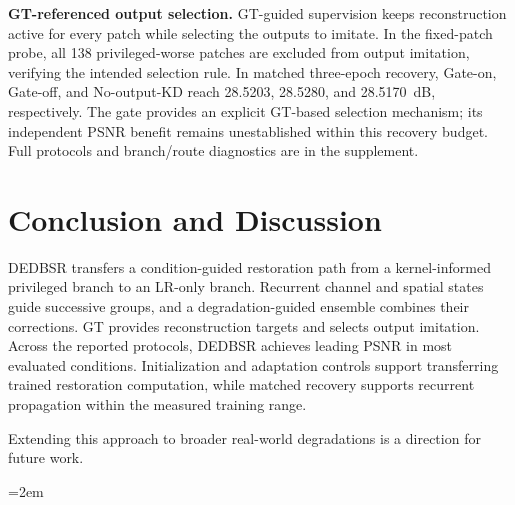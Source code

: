 \documentclass[10pt,journal,letterpaper]{IEEEtran}
\begin{document}
\noindent\textbf{GT-referenced output selection.}
GT-guided supervision keeps reconstruction active for every patch while selecting the outputs to imitate. In the fixed-patch probe, all 138 privileged-worse patches are excluded from output imitation, verifying the intended selection rule. In matched three-epoch recovery, Gate-on, Gate-off, and No-output-KD reach 28.5203, 28.5280, and 28.5170~dB, respectively. The gate provides an explicit GT-based selection mechanism; its independent PSNR benefit remains unestablished within this recovery budget. Full protocols and branch/route diagnostics are in the supplement.

\balance

\section{Conclusion and Discussion}
DEDBSR transfers a condition-guided restoration path from a kernel-informed privileged branch to an LR-only branch. Recurrent channel and spatial states guide successive groups, and a degradation-guided ensemble combines their corrections. GT provides reconstruction targets and selects output imitation. Across the reported protocols, DEDBSR achieves leading PSNR in most evaluated conditions. Initialization and adaptation controls support transferring trained restoration computation, while matched recovery supports recurrent propagation within the measured training range.

Extending this approach to broader real-world degradations is a direction for future work.

\clearpage
\nobalance
\begingroup
\emergencystretch=2em


\endgroup
\end{document}
